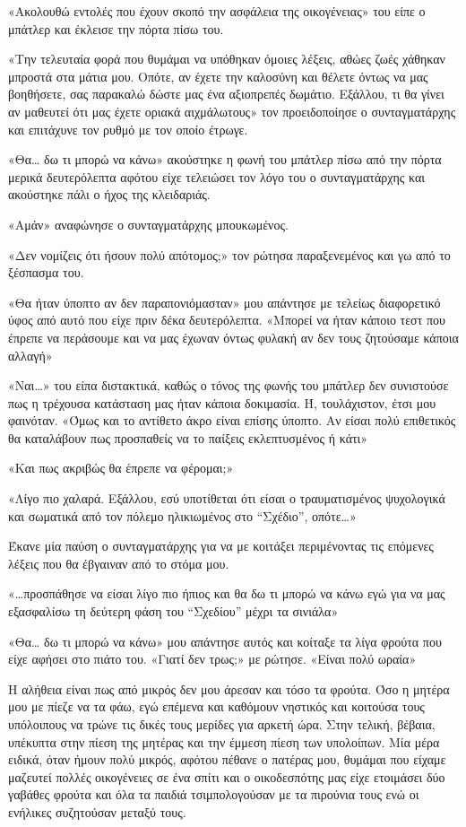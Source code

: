 \documentclass[12pt,twoside, openany]{book}
\begin{document}
«Ακολουθώ εντολές που έχουν σκοπό την ασφάλεια της οικογένειας» του είπε ο μπάτλερ και έκλεισε την πόρτα πίσω του.

«Την τελευταία φορά που θυμάμαι να υπόθηκαν όμοιες λέξεις, αθώες ζωές χάθηκαν μπροστά στα μάτια μου. Οπότε, αν έχετε την καλοσύνη και θέλετε όντως να μας βοηθήσετε, σας παρακαλώ δώστε μας ένα αξιοπρεπές δωμάτιο. Εξάλλου, τι θα γίνει αν μαθευτεί ότι μας έχετε οριακά αιχμάλωτους» τον προειδοποίησε ο συνταγματάρχης και επιτάχυνε τον ρυθμό με τον οποίο έτρωγε.

«Θα… δω τι μπορώ να κάνω» ακούστηκε η φωνή του μπάτλερ πίσω από την πόρτα μερικά δευτερόλεπτα αφότου είχε τελειώσει τον λόγο του ο συνταγματάρχης και ακούστηκε πάλι ο ήχος της κλειδαριάς.

«Αμάν» αναφώνησε ο συνταγματάρχης μπουκωμένος.

«Δεν νομίζεις ότι ήσουν πολύ απότομος;» τον ρώτησα παραξενεμένος και γω από το ξέσπασμα του.

«Θα ήταν ύποπτο αν δεν παραπονιόμασταν» μου απάντησε με τελείως διαφορετικό ύφος από αυτό που είχε πριν δέκα δευτερόλεπτα. «Μπορεί να ήταν κάποιο τεστ που έπρεπε να περάσουμε και να μας έχωναν όντως φυλακή αν δεν τους ζητούσαμε κάποια αλλαγή»

«Ναι…» του είπα διστακτικά, καθώς ο τόνος της φωνής του μπάτλερ δεν συνιστούσε πως η τρέχουσα κατάσταση μας ήταν κάποια δοκιμασία. Ή, τουλάχιστον, έτσι μου φαινόταν. «Όμως και το αντίθετο άκρο είναι επίσης ύποπτο. Αν είσαι πολύ επιθετικός θα καταλάβουν πως προσπαθείς να το παίξεις εκλεπτυσμένος ή κάτι»

«Και πως ακριβώς θα έπρεπε να φέρομαι;»

«Λίγο πιο χαλαρά. Εξάλλου, εσύ υποτίθεται ότι είσαι ο τραυματισμένος ψυχολογικά και σωματικά από τον πόλεμο ηλικιωμένος στο “Σχέδιο”, οπότε…»

Έκανε μία παύση ο συνταγματάρχης για να με κοιτάξει περιμένοντας τις επόμενες λέξεις που θα έβγαιναν από το στόμα μου.

«…προσπάθησε να είσαι λίγο πιο ήπιος και θα δω τι μπορώ να κάνω εγώ για να μας εξασφαλίσω τη δεύτερη φάση του “Σχεδίου” μέχρι τα σινιάλα»

«Θα… δω τι μπορώ να κάνω» μου απάντησε αυτός και κοίταξε τα λίγα φρούτα που είχε αφήσει στο πιάτο του. «Γιατί δεν τρως;» με ρώτησε. «Είναι πολύ ωραία»

Η αλήθεια είναι πως από μικρός δεν μου άρεσαν και τόσο τα φρούτα. Όσο η μητέρα μου με πίεζε να τα φάω, εγώ επέμενα και καθόμουν νηστικός και κοιτούσα τους υπόλοιπους να τρώνε τις δικές τους μερίδες για αρκετή ώρα. Στην τελική, βέβαια, υπέκυπτα στην πίεση της μητέρας και την έμμεση πίεση των υπολοίπων. Μία μέρα ειδικά, όταν ήμουν πολύ μικρός, αφότου πέθανε ο πατέρας μου, θυμάμαι που είχαμε μαζευτεί πολλές οικογένειες σε ένα σπίτι και ο οικοδεσπότης μας είχε ετοιμάσει δύο γαβάθες φρούτα και όλα τα παιδιά τσιμπολογούσαν με τα πιρούνια τους ενώ οι ενήλικες συζητούσαν μεταξύ τους.
\end{document}
